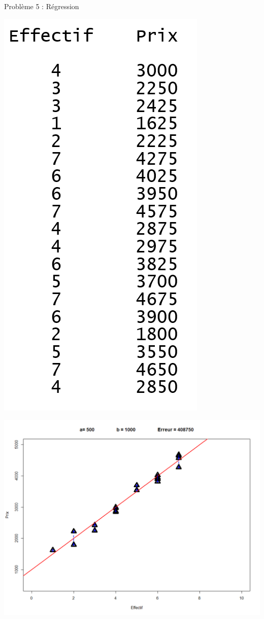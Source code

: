 \documentclass[10pt]{beamer}
\begin{document}

\begin{frame}{Problème 5 : Régression} 
\hspace{-0.12\textwidth}
\begin{minipage}{0.45\textwidth}
 \begin{center}
\includegraphics[height=\textwidth]{figures/data_coiffeur.PNG}
\end{center} 
\end{minipage}
\begin{minipage}{0.53\textwidth}
\begin{center}
\includegraphics[height=1\textwidth]{figures/reg3.PNG}
\end{center}
\end{minipage}
\end{frame}
\end{document}
